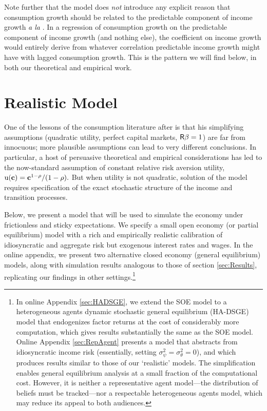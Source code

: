 \documentclass[titlepage]{./econtex}
\begin{document}
Note further that the model does {\it not} introduce any explicit reason that consumption growth should be related to the predictable component of income growth {\it a la} \cite{cmModel}.  In a regression of consumption growth on the predictable component of income growth (and nothing else), the coefficient on income growth would entirely derive from whatever correlation predictable income growth might have with lagged consumption growth.  This is the pattern we will find below, in both our theoretical and empirical work.



\section{Realistic Model}
\label{sec:models}

One of the lessons of the consumption literature after \cite{hallRandomWalk} is that his simplifying assumptions (quadratic utility, perfect capital markets, $\mathsf{R}\beta=1$) are far from innocuous; more plausible assumptions can lead to very different conclusions.  In particular, a host of persuasive theoretical and empirical considerations has led to the now-standard assumption of constant relative risk aversion utility, ${\mathrm{u}}(\mathbf{c})=\mathbf{c}^{1-\rho}/(1-\rho).$ But when utility is not quadratic, solution of the model requires specification of the exact stochastic structure of the income and transition processes.

Below, we present a model that will be used to simulate the economy under frictionless and sticky expectations.  We specify a small open economy (or partial equilibrium) model with a rich and empirically realistic calibration of idiosyncratic and aggregate risk but exogenous interest rates and wages. In the online appendix, we present two alternative closed economy (general equilibrium) models, along with simulation results analogous to those of section \ref{sec:Results}, replicating our findings in other settings.\footnote{In online Appendix \ref{sec:HADSGE}, we extend the SOE model to a heterogeneous agents dynamic stochastic general equilibrium (HA-DSGE) model that endogenizes factor returns at the cost of considerably more computation, which gives results substantially the same as the SOE model.  Online Appendix \ref{sec:RepAgent} presents a model that abstracts from idiosyncratic income risk (essentially, setting $\sigma^{2}_{\psi}=\sigma^{2}_{\theta}=0$), and which produces results similar to those of our `realistic' models.  The simplification enables general equilibrium analysis at a small fraction of the computational cost. However, it is neither a representative agent model---the distribution of beliefs must be tracked---nor a respectable heterogeneous agents model, which may reduce its appeal to both audiences.}
\end{document}
